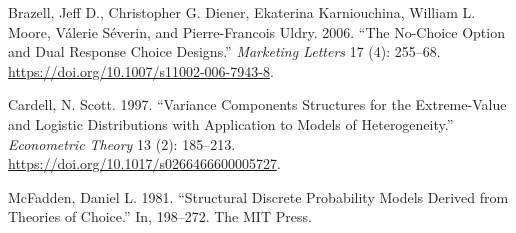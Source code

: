 \documentclass[
]{article}
\newlength{\cslhangindent}
\newenvironment{CSLReferences}[2] %
 {\begin{list}{}{%
  \setlength{\itemindent}{0pt}
  \setlength{\leftmargin}{0pt}
  \setlength{\parsep}{0pt}
  \ifodd #1
   \setlength{\leftmargin}{\cslhangindent}
   \setlength{\itemindent}{-1\cslhangindent}
  \fi
  \setlength{\itemsep}{#2\baselineskip}}}
 {\end{list}}
\begin{document}
\label{refs}
\begin{CSLReferences}{1}{0}
Brazell, Jeff D., Christopher G. Diener, Ekaterina Karniouchina, William
L. Moore, Válerie Séverin, and Pierre-Francois Uldry. 2006. {``The
No-Choice Option and Dual Response Choice Designs.''} \emph{Marketing
Letters} 17 (4): 255--68.
\url{https://doi.org/10.1007/s11002-006-7943-8}.

Cardell, N. Scott. 1997. {``Variance Components Structures for the
Extreme-Value and Logistic Distributions with Application to Models of
Heterogeneity.''} \emph{Econometric Theory} 13 (2): 185--213.
\url{https://doi.org/10.1017/s0266466600005727}.

McFadden, Daniel L. 1981. {``Structural Discrete Probability Models
Derived from Theories of Choice.''} In, 198--272. The MIT Press.

\end{CSLReferences}
\end{document}
